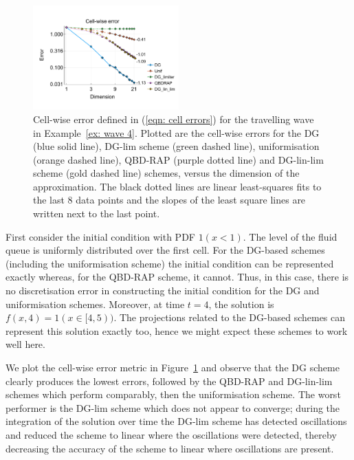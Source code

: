 \begin{example}\label{ex: wave 4}
	\begin{figure}[h]
		\centering
		\includegraphics[width=0.5\textwidth,trim={0.75cm 0.8cm 0.25cm 1.25cm},clip]{chapter6/figs/wave/fun4/L1_cell_probs.pdf}
		\caption{Cell-wise error defined in (\ref{eqn: cell errors}) for the travelling wave in Example~\ref{ex: wave 4}. Plotted are the cell-wise errors for the DG (blue solid line), DG-lim scheme (green dashed line), uniformisation (orange dashed line), QBD-RAP (purple dotted line) and DG-lin-lim scheme (gold dashed line) schemes, versus the dimension of the approximation. The black dotted lines are linear least-squares fits to the last 8 data points and the slopes of the least square lines are written next to the last point.}
		\label{fig: fun 4 wave cp} 
	\end{figure}
First consider the initial condition with PDF \(1(x<1)\). The level of the fluid queue is uniformly distributed over the first cell. For the DG-based schemes (including the uniformisation scheme) the initial condition can be represented exactly whereas, for the QBD-RAP scheme, it cannot. Thus, in this case, there is no discretisation error in constructing the initial condition for the DG and uniformisation schemes. Moreover, at time \(t=4\), the solution is \(f(x,4)=1(x\in[4,5))\). The projections related to the DG-based schemes can represent this solution exactly too, hence we might expect these schemes to work well here. 

We plot the cell-wise error metric in Figure~\ref{fig: fun 4 wave cp} and observe that the DG scheme clearly produces the lowest errors, followed by the QBD-RAP and DG-lin-lim schemes which perform comparably, then the uniformisation scheme. The worst performer is the DG-lim scheme which does not appear to converge; during the integration of the solution over time the DG-lim scheme has detected oscillations and reduced the scheme to linear where the oscillations were detected, thereby decreasing the accuracy of the scheme to linear where oscillations are present. 


\end{example}

